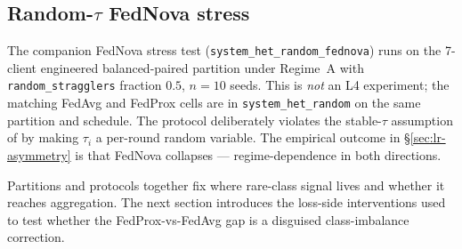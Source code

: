 \documentclass[11pt,a4paper]{report}
\begin{document}
\subsection{Random-$\tau$ FedNova stress}

The companion FedNova stress test (\texttt{system\_het\_random\_fednova})
runs on the 7-client engineered balanced-paired partition under
Regime~A with \texttt{random\_stragglers} fraction $0.5$, $n = 10$
seeds. This is \emph{not} an L4 experiment; the matching FedAvg and
FedProx cells are in \texttt{system\_het\_random} on the same partition
and schedule. The protocol deliberately violates the stable-$\tau$
assumption of \citet{wang2020fednova} by making $\tau_i$ a per-round
random variable. The empirical outcome in §\ref{sec:lr-asymmetry} is
that FedNova collapses --- regime-dependence in both directions.

Partitions and protocols together fix where rare-class signal lives and
whether it reaches aggregation. The next section introduces the loss-side
interventions used to test whether the FedProx-vs-FedAvg gap is a
disguised class-imbalance correction.

\begin{table}[H]
\centering
\small
\caption{Four-condition decomposition design (L4, two-client, Regime~B,
$E_{\textrm{straggler}} = 5$ on Client~1, $n = 3$ matched seeds per
cell). Holding the partition and schedule fixed across all four cells
isolates the optimiser-vs-protocol contribution. The design omits the
FedAvg + $\gamma$-inexact cell, so the $\gamma$-inexact attribution is
to the FedProx + $\gamma$-inexact \emph{protocol} rather than to
$\gamma$-inexact acceptance as a standalone universal mechanism.}
\label{tab:four-condition-design}
\end{table}
\end{document}
